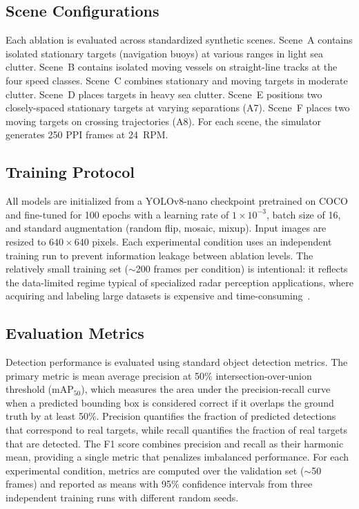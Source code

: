 \documentclass[colorlinks,upint,balance]{asmeconf}
\begin{document}
\subsection{Scene Configurations}

Each ablation is evaluated across standardized synthetic scenes. Scene~A contains isolated stationary targets (navigation buoys) at various ranges in light sea clutter. Scene~B contains isolated moving vessels on straight-line tracks at the four speed classes. Scene~C combines stationary and moving targets in moderate clutter. Scene~D places targets in heavy sea clutter. Scene~E positions two closely-spaced stationary targets at varying separations (A7). Scene~F places two moving targets on crossing trajectories (A8). For each scene, the simulator generates 250 PPI frames at 24~RPM.

\subsection{Training Protocol}

All models are initialized from a YOLOv8-nano checkpoint pretrained on COCO and fine-tuned for 100 epochs with a learning rate of $1 \times 10^{-3}$, batch size of 16, and standard augmentation (random flip, mosaic, mixup). Input images are resized to $640 \times 640$ pixels. Each experimental condition uses an independent training run to prevent information leakage between ablation levels. The relatively small training set ($\sim$200 frames per condition) is intentional: it reflects the data-limited regime typical of specialized radar perception applications, where acquiring and labeling large datasets is expensive and time-consuming~\cite{Shorten2019DataAugmentation}.

\subsection{Evaluation Metrics}

Detection performance is evaluated using standard object detection metrics. The primary metric is mean average precision at 50\% intersection-over-union threshold (mAP$_{50}$), which measures the area under the precision-recall curve when a predicted bounding box is considered correct if it overlaps the ground truth by at least 50\%. Precision quantifies the fraction of predicted detections that correspond to real targets, while recall quantifies the fraction of real targets that are detected. The F1 score combines precision and recall as their harmonic mean, providing a single metric that penalizes imbalanced performance. For each experimental condition, metrics are computed over the validation set ($\sim$50 frames) and reported as means with 95\% confidence intervals from three independent training runs with different random seeds.
\end{document}
